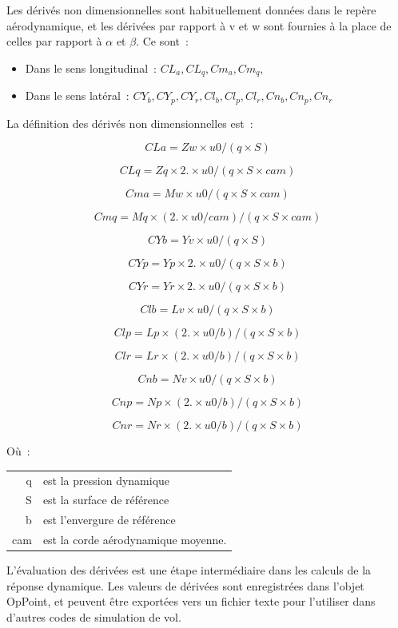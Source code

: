 \documentclass[a4paper,twoside,12pt,dvips]{article}
\begin{document}
Les dérivés non dimensionnelles sont habituellement données dans le repère aérodynamique, et les dérivées par rapport à v et w sont fournies à la place de celles par rapport à $\alpha$ et $\beta$. Ce sont~:

\begin{itemize}
  \item Dans le sens longitudinal~: $CL_a, CL_q, Cm_a, Cm_q$,
  \item Dans le sens latéral~: $CY_b, CY_p, CY_r, Cl_b, Cl_p, Cl_r, Cn_b, Cn_p, Cn_r$
\end{itemize}

La définition des dérivés non dimensionnelles est~:

$$CLa = Zw \times u0  / (q \times S)$$

$$CLq = Zq \times 2. \times u0 / (q \times S \times cam)$$

$$Cma = Mw \times u0 / (q \times S \times cam)$$

$$Cmq = Mq \times (2. \times u0 / cam) / (q \times S \times cam)$$

$$CYb = Yv \times u0 / (q \times S)$$

$$CYp = Yp \times  2. \times u0 / (q \times S \times b)$$

$$CYr = Yr \times  2. \times u0 / (q \times S \times b)$$

$$Clb = Lv \times u0 / (q \times S \times b)$$

$$Clp = Lp \times (2. \times u0 / b) /(q \times S \times b)$$

$$Clr = Lr \times (2. \times u0 / b) /(q \times S \times b)$$

$$Cnb = Nv \times u0 / (q \times S \times b)$$

$$Cnp = Np \times (2. \times u0 / b) /(q \times S \times b)$$

$$Cnr = Nr \times (2. \times u0 / b) /(q \times S \times b)$$

Où~:

\begin{tabular}{rl}
  q & est la pression dynamique\\
  S & est la surface de référence\\
  b & est l’envergure de référence\\
  cam & est la corde aérodynamique moyenne.
\end{tabular}

L’évaluation des dérivées est une étape intermédiaire dans les calculs
de la réponse dynamique. Les valeurs de dérivées sont enregistrées
dans l’objet OpPoint, et peuvent être exportées vers un fichier texte
pour l’utiliser dans d’autres codes de simulation de vol.
\end{document}
